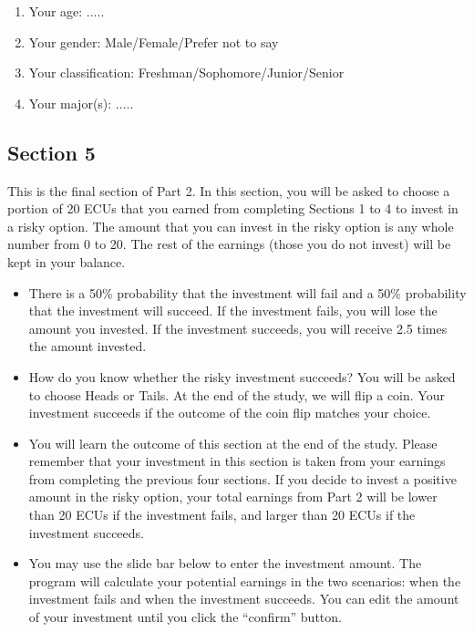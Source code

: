\documentclass[11pt]{article}
\begin{document}
\begin{enumerate}
  \item Your age: .....
  \item Your gender: Male/Female/Prefer not to say 
  \item Your classification: Freshman/Sophomore/Junior/Senior
  \item Your major(s): .....
\end{enumerate}


\newpage


\subsection*{Section 5}

This is the final section of Part 2. In this section, you will be asked to choose a portion of 20 ECUs that you earned from completing Sections 1 to 4 to invest in a risky option.  The amount that you can invest in the risky option is any whole number from 0 to 20. The rest of the earnings (those you do not invest) will be kept in your balance.


\begin{itemize}

 \item  There is a 50\% probability that the investment will fail and a 50\% probability that the investment will succeed. If the investment fails, you will lose the amount you invested. If the investment succeeds, you will receive 2.5 times the amount invested. 

 \item  How do you know whether the risky investment succeeds? You will be asked to choose Heads or Tails. At the end of the study, we will flip a coin. Your investment succeeds if the outcome of the coin flip matches your choice. 

 \item You will learn the outcome of this section at the end of the study.  Please remember that your investment in this section is taken from your earnings from completing the previous four sections.  If you decide to invest a positive amount in the risky option, your total earnings from Part 2 will be lower than 20 ECUs if the investment fails, and larger than 20 ECUs if the investment succeeds.

 \item You may use the slide bar below to enter the investment amount. The program will calculate your potential earnings in the two scenarios: when the investment fails and when the investment succeeds. You can edit the amount of your investment until you click the “confirm” button. 

 
\end{itemize}
\end{document}
